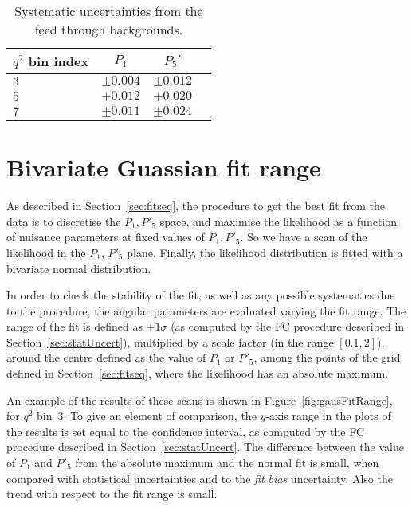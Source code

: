 \begin{table*}[!htb]
  \begin {center}
    \begin{small}
      \caption{Systematic uncertainties from the feed through backgrounds.
        \label{tab:feed-through}}
      \begin{tabular}{l|c|c|c}
        $q^2$ bin index & $P_1$ & $P_5'$ \\
        \hline
        $3$ & $\pm 0.004$ & $\pm 0.012$ \\
        $5$ & $\pm 0.012$ & $\pm 0.020$ \\
        $7$ & $\pm 0.011$ & $\pm 0.024$ \\
      \end{tabular}
    \end{small}
  \end{center}
\end{table*}

\section{Bivariate Guassian fit range}\label{sec:bestFit}

As described in Section~\ref{sec:fitseq}, the procedure to get the best fit from the data is to discretise the $P_1,P'_5$ space, and maximise the likelihood as a function of nuisance parameters at fixed values of $P_1,P'_5$.
So we have a scan of the likelihood in the $P_1$, $P'_5$ plane.
Finally, the likelihood distribution is fitted with a bivariate normal distribution.

In order to check the stability of the fit, as well as any possible systematics due to the procedure, the angular parameters are evaluated varying the fit range.
The range of the fit is defined as $\pm1\sigma$ (as computed by the FC procedure described in Section~\ref{sec:statUncert}), multiplied by a scale factor (in the range $[0.1,2]$), around the centre defined as the value of $P_1$ or $P'_5$, among the points of the grid defined in Section~\ref{sec:fitseq}, where the likelihood has an absolute maximum.

An example of the results of these scans is shown in Figure~\ref{fig:gausFitRange}, for $q^2$ bin~3.
To give an element of comparison, the $y$-axis range in the plots of the results is set equal to the confidence interval, as computed by the FC procedure described in Section~\ref{sec:statUncert}. 
The difference between the value of $P_1$ and $P'_5$ from the absolute maximum and the normal fit is small, when compared with statistical uncertainties and to the \textit{fit bias} uncertainty.
Also the trend with respect to the fit range is small.

